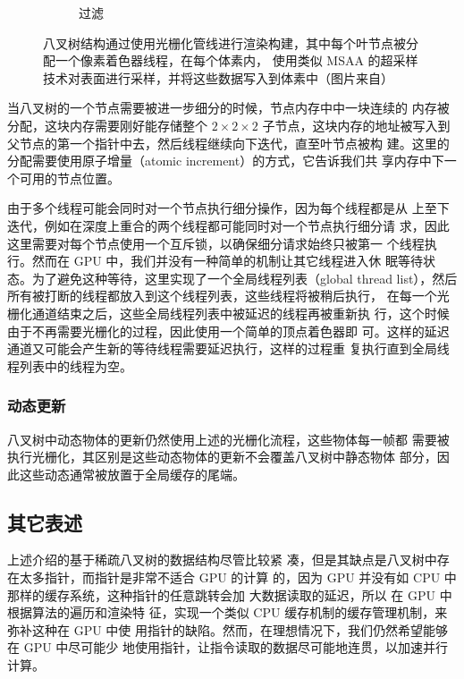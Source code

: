 \begin{figure}
\begin{fullwidth}
\begin{subfigure}[b]{0.2425\thewidth}
		\caption{过滤}
	\end{subfigure}
	\caption{八叉树结构通过使用光栅化管线进行渲染构建，其中每个叶节点被分配一个像素着色器线程，在每个体素内， 使用类似 MSAA 的超采样技术对表面进行采样，并将这些数据写入到体素中（图片来自\cite{a:Practicalreal-timevoxelbasedglobalilluminationforcurrentgpus}）}
	\label{f:vct-voxel-1}
\end{fullwidth}
\end{figure}

当八叉树的一个节点需要被进一步细分的时候，节点内存中中一块连续的 内存被分配，这块内存需要刚好能存储整个 $2\times 2\times 2$ 子节点，这块内存的地址被写入到父节点的第一个指针中去，然后线程继续向下迭代，直至叶节点被构 建。这里的分配需要使用原子增量（atomic increment）的方式，它告诉我们共 享内存中下一个可用的节点位置。

由于多个线程可能会同时对一个节点执行细分操作，因为每个线程都是从 上至下迭代，例如在深度上重合的两个线程都可能同时对一个节点执行细分请 求，因此这里需要对每个节点使用一个互斥锁，以确保细分请求始终只被第一 个线程执行。然而在 GPU 中，我们并没有一种简单的机制让其它线程进入休 眠等待状态。为了避免这种等待，这里实现了一个全局线程列表（global thread list），然后所有被打断的线程都放入到这个线程列表，这些线程将被稍后执行， 在每一个光栅化通道结束之后，这些全局线程列表中被延迟的线程再被重新执 行，这个时候由于不再需要光栅化的过程，因此使用一个简单的顶点着色器即 可。这样的延迟通道又可能会产生新的等待线程需要延迟执行，这样的过程重 复执行直到全局线程列表中的线程为空。



\subsubsection{动态更新}
八叉树中动态物体的更新仍然使用上述的光栅化流程，这些物体每一帧都 需要被执行光栅化，其区别是这些动态物体的更新不会覆盖八叉树中静态物体 部分，因此这些动态通常被放置于全局缓存的尾端。



\subsection{其它表述}
上述介绍的基于稀疏八叉树的数据结构\cite{a:InteractiveIndirectIlluminationUsingVoxelConeTracing}尽管比较紧 凑，但是其缺点是八叉树中存在太多指针，而指针是非常不适合 GPU 的计算 的，因为 GPU 并没有如 CPU 中那样的缓存系统，这种指针的任意跳转会加 大数据读取的延迟，所以 \cite{a:Gigavoxels:Avoxelbasedrenderingpipelineforefficientexplorationoflargeanddetailedscenes} 在 GPU 中根据算法的遍历和渲染特 征，实现一个类似 CPU 缓存机制的缓存管理机制，来弥补这种在 GPU 中使 用指针的缺陷。然而，在理想情况下，我们仍然希望能够在 GPU 中尽可能少 地使用指针，让指令读取的数据尽可能地连贯，以加速并行计算。

